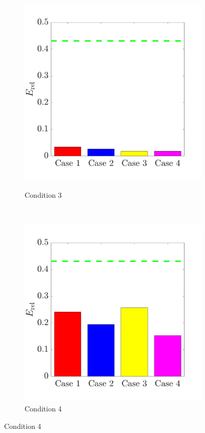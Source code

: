 \documentclass{jov}
\begin{document}
\begin{figure}
\begin{subfigure}{0.22 \textwidth}
	\label{fig:case2Bar}
    \end{subfigure}
    ~ 
        \begin{subfigure}{0.22 \textwidth}
	\caption{Condition 3}
	\includegraphics[width=\textwidth]{../Figures/Figure15/Figure15_c.pdf}
	\label{fig:case3Bar}
    \end{subfigure}
    ~ 
        \begin{subfigure}{0.22 \textwidth}
	\caption{Condition 4}
	\includegraphics[width=\textwidth]{../Figures/Figure15/Figure15_d.pdf}

\end{subfigure}
\end{figure}
\end{document}
